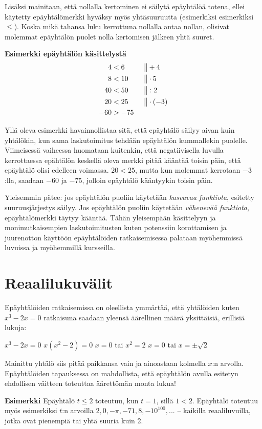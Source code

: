 Lisäksi mainitaan, että nollalla kertominen ei säilytä epäyhtälöä totena, ellei käytetty epäyhtälömerkki hyväksy myös yhtäsuuruutta (esimerkiksi esimerkiksi $\leq$). Koska mikä tahansa luku kerrottuna nollalla antaa nollan, olisivat molemmat epäyhtälön puolet nolla kertomisen jälkeen yhtä suuret.

\textbf{Esimerkki epäyhtälön käsittelystä}
\begin{align*}
4&<6  \ \ \ \ \ &&\big\| +4 \\
8&<10 &&\big\| \cdot 5 \\
40&<50 &&\big\| :2 \\
20&<25 &&\big\| \cdot (-3) \\
-60&>-75
\end{align*}

Yllä oleva esimerkki havainnollistaa sitä, että epäyhtälö säilyy aivan kuin
yhtälökin, kun sama laskutoimitus tehdään epäyhtälön kummallekin puolelle.
Viimeisessä vaiheessa huomataan kuitenkin, että negatiivisella luvulla
kerrottaessa epähtälön keskellä oleva merkki pitää kääntää toisin päin, että
epäyhtälö olisi edelleen voimassa. $20<25$, mutta kun molemmat kerrotaan
$-3$:lla, saadaan $-60$ ja $-75$, jolloin epäyhtälö kääntyykin toisin päin.

Yleisemmin pätee: jos epäyhtälön puoliin käytetään \emph{kasvavaa funktiota}, esitetty suuruusjärjestys säilyy. Jos epäyhtälön puoliin käytetään \emph{vähenevää funktiota}, epäyhtälömerkki täytyy kääntää. Tähän yleisempään käsittelyyn ja monimutkaisempien laskutoimitusten kuten potenssiin korottamisen ja juurenotton käyttöön epäyhtälöiden ratkaisemisessa palataan myöhemmissä luvuissa ja myöhemmillä kursseilla.

\section{Reaalilukuvälit}

Epäyhtälöiden ratkaisemissa on oleellista ymmärtää, että yhtälöiden kuten $x^3-2x=0$ ratkaisuna saadaan yleensä äärellinen määrä yksittäisiä, erillisiä lukuja:

$x^3-2x=0$
$x(x^2-2)=0$
$x=0$ tai $x^2=2$
$x=0$ tai $x=\pm \sqrt{2}$

Mainittu yhtälö siis pitää paikkansa vain ja ainoastaan kolmella $x$:n arvolla. Epäyhtälöiden tapauksessa on mahdollista, että epäyhtälön avulla esitetyn ehdollisen väitteen toteuttaa äärettömän monta lukua!

\textbf{Esimerkki}
Epäyhtälö $t \leq 2$ toteutuu, kun $t=1$, sillä $1<2$. Epäyhtälö toteutuu myös esimerkiksi $t$:n arvoilla $2, 0, -\pi, -71,8, -10^100, ...$ – kaikilla reaaliluvuilla, jotka ovat pienempiä tai yhtä suuria kuin 2.

